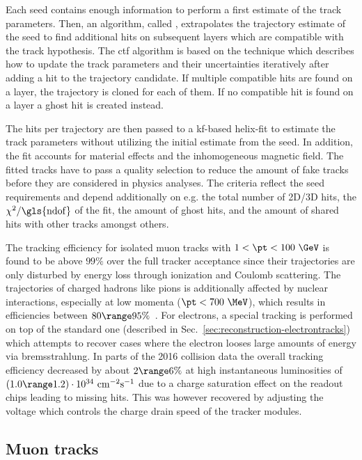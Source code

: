 Each seed contains enough information to perform a first estimate of the track parameters. Then, an algorithm, called , extrapolates the trajectory estimate of the seed to find additional hits on subsequent layers which are compatible with the track hypothesis. The \gls{ctf} algorithm is based on the  technique which describes how to update the track parameters and their uncertainties iteratively after adding a hit to the trajectory candidate. If multiple compatible hits are found on a layer, the trajectory is cloned for each of them. If no compatible hit is found on a layer a ghost hit is created instead.

The hits per trajectory are then passed to a \gls{kf}-based helix-fit to estimate the track parameters without utilizing the initial estimate from the seed. In addition, the fit accounts for material effects and the inhomogeneous magnetic field.  The fitted tracks have to pass a quality selection to reduce the amount of fake tracks before they are considered in physics analyses. The criteria reflect the seed requirements and depend additionally on e.g. the total number of 2D/3D hits, the $\chi^2/\mathrm{\gls{ndof}}$ of the fit, the amount of ghost hits, and the amount of shared hits with other tracks amongst others.

The tracking efficiency for isolated muon tracks with $1<\pt<100~\GeV$ is found to be above $99\%$ over the full tracker acceptance since their trajectories are only disturbed by energy loss through ionization and Coulomb scattering. The trajectories of charged hadrons like pions is additionally affected by nuclear interactions, especially at low momenta ($\pt<700~\MeV$), which results in efficiencies between $80\range95\%$~\cite{Chatrchyan:2014fea}. For electrons, a special tracking is performed on top of the standard one (described in Sec.~\ref{sec:reconstruction-electrontracks}) which attempts to recover cases where the electron looses large amounts of energy via bremsstrahlung. In parts of the 2016 collision data the overall tracking efficiency decreased by about $2\range6\%$ at high instantaneous luminosities of $(1.0\range1.2)\cdot10^{34}~\mathrm{cm}^{-2}\mathrm{s}^{-1}$ due to a charge saturation effect on the readout chips leading to missing hits. This was however recovered by adjusting the voltage which controls the charge drain speed of the tracker modules.

\subsection{Muon tracks}
\label{sec:reconstruction-muontracks}

